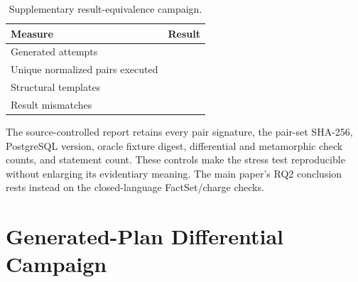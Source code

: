 \documentclass[journal,onecolumn]{IEEEtran}
\begin{document}
\begin{table}[h]
\centering
\caption{Supplementary result-equivalence campaign.}
\small
\begin{tabular}{L{0.58\columnwidth}r}
\toprule
Measure & Result \\
\midrule
Generated attempts & \RQTwoPairs{} \\
Unique normalized pairs executed & \RQTwoUnique{} \\
Structural templates & \RQTwoTemplates{} \\
Result mismatches & \RQTwoMismatches{} \\
\bottomrule
\end{tabular}
\end{table}

The source-controlled report retains every pair signature, the pair-set
SHA-256, PostgreSQL version, oracle fixture digest, differential and
metamorphic check counts, and statement count.  These controls make the stress
test reproducible without enlarging its evidentiary meaning.  The main paper's
RQ2 conclusion rests instead on the closed-language FactSet/charge checks.

\section{Generated-Plan Differential Campaign}
\label{sec:generated-supp}
\end{document}
